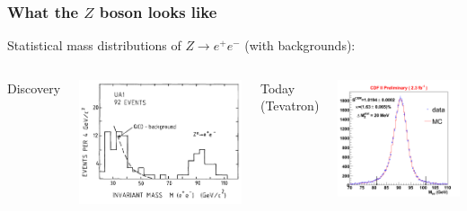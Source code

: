 \documentclass[compress]{beamer}
\begin{document}
\begin{frame}
\frametitle{What the $Z$ boson looks like}

Statistical mass distributions of $Z \to e^+e^-$ (with backgrounds):

\begin{columns}
\begin{center}
Discovery
\end{center}
\includegraphics[width=\linewidth]{z_discovery.png}

\begin{center}
Today (Tevatron)
\end{center}
\includegraphics[width=\linewidth]{cdf_23_zee.png}


\end{columns}
\end{frame}
\end{document}
